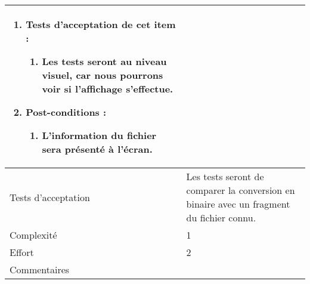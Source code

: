 \begin{longtable}{|l|p{}|}
\begin{enumerate}[label*=\arabic*.]
\begin{enumerate}[label*=\arabic*.]
\begin{enumerate}[label*=\arabic*.]
                                \end{enumerate}
                                \item Tests d'acceptation de cet item :
                                \begin{enumerate}[label*=\arabic*.]
                                    \item Les tests seront au niveau visuel, car nous pourrons voir si l'affichage s'effectue.
                                \end{enumerate}
                                \item Post-conditions :
                                \begin{enumerate}[label*=\arabic*.]
                                    \item L'information du fichier sera présenté à l'écran.
                                \end{enumerate}
                            \end{enumerate}                
        \end{enumerate} \\
\hline
    Tests d'acceptation & Les tests seront de comparer la conversion en binaire avec un fragment du fichier connu. \\
\hline
    Complexité & 1 \\
\hline
    Effort & 2 \\
\hline
    Commentaires &  \\
\hline
\end{longtable}